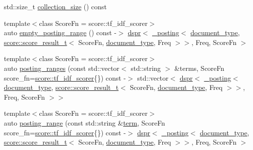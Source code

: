 \begin{DoxyCompactItemize}
\item 
std\+::size\+\_\+t \mbox{\hyperlink{classirk_1_1inverted__index_a6666e1a0c0facdec6c805abc153a9ea7}{collection\+\_\+size}} () const
\item 
{\footnotesize template$<$class Score\+Fn  = score\+::tf\+\_\+idf\+\_\+scorer$>$ }\\auto \mbox{\hyperlink{classirk_1_1inverted__index_ae2401a96c224235b8efb4ca40c580f18}{empty\+\_\+posting\+\_\+range}} () const -\/$>$ \mbox{\hyperlink{namespaceirk_af92c7aae439f59ccae252f027f851c24}{dspr}}$<$ \mbox{\hyperlink{structirk_1_1__posting}{\+\_\+posting}}$<$ \mbox{\hyperlink{classirk_1_1inverted__index_ab708a9d1605de705341f3ed81bd7d5e7}{document\+\_\+type}}, \mbox{\hyperlink{namespaceirk_1_1score_af4a2c84b3548a4ac12aac3862bc94875}{score\+::score\+\_\+result\+\_\+t}}$<$ Score\+Fn, \mbox{\hyperlink{classirk_1_1inverted__index_ab708a9d1605de705341f3ed81bd7d5e7}{document\+\_\+type}}, Freq $>$$>$, Freq, Score\+Fn $>$
\item 
{\footnotesize template$<$class Score\+Fn  = score\+::tf\+\_\+idf\+\_\+scorer$>$ }\\auto \mbox{\hyperlink{classirk_1_1inverted__index_ada3586a485b42d220669d319f6b5acc4}{posting\+\_\+ranges}} (const std\+::vector$<$ std\+::string $>$ \&terms, Score\+Fn score\+\_\+fn=\mbox{\hyperlink{structirk_1_1score_1_1tf__idf__scorer}{score\+::tf\+\_\+idf\+\_\+scorer}}\{\}) const -\/$>$ std\+::vector$<$ \mbox{\hyperlink{namespaceirk_af92c7aae439f59ccae252f027f851c24}{dspr}}$<$ \mbox{\hyperlink{structirk_1_1__posting}{\+\_\+posting}}$<$ \mbox{\hyperlink{classirk_1_1inverted__index_ab708a9d1605de705341f3ed81bd7d5e7}{document\+\_\+type}}, \mbox{\hyperlink{namespaceirk_1_1score_af4a2c84b3548a4ac12aac3862bc94875}{score\+::score\+\_\+result\+\_\+t}}$<$ Score\+Fn, \mbox{\hyperlink{classirk_1_1inverted__index_ab708a9d1605de705341f3ed81bd7d5e7}{document\+\_\+type}}, Freq $>$$>$, Freq, Score\+Fn $>$$>$
\item 
{\footnotesize template$<$class Score\+Fn  = score\+::tf\+\_\+idf\+\_\+scorer$>$ }\\auto \mbox{\hyperlink{classirk_1_1inverted__index_a95a85fe09dae6dfb47cd7bdfa8ce2a4d}{posting\+\_\+range}} (const std\+::string \&\mbox{\hyperlink{classirk_1_1inverted__index_af6d217382bf3bed6b19a009cb0274148}{term}}, Score\+Fn score\+\_\+fn=\mbox{\hyperlink{structirk_1_1score_1_1tf__idf__scorer}{score\+::tf\+\_\+idf\+\_\+scorer}}\{\}) const -\/$>$ \mbox{\hyperlink{namespaceirk_af92c7aae439f59ccae252f027f851c24}{dspr}}$<$ \mbox{\hyperlink{structirk_1_1__posting}{\+\_\+posting}}$<$ \mbox{\hyperlink{classirk_1_1inverted__index_ab708a9d1605de705341f3ed81bd7d5e7}{document\+\_\+type}}, \mbox{\hyperlink{namespaceirk_1_1score_af4a2c84b3548a4ac12aac3862bc94875}{score\+::score\+\_\+result\+\_\+t}}$<$ Score\+Fn, \mbox{\hyperlink{classirk_1_1inverted__index_ab708a9d1605de705341f3ed81bd7d5e7}{document\+\_\+type}}, Freq $>$$>$, Freq, Score\+Fn $>$

\end{DoxyCompactItemize}
